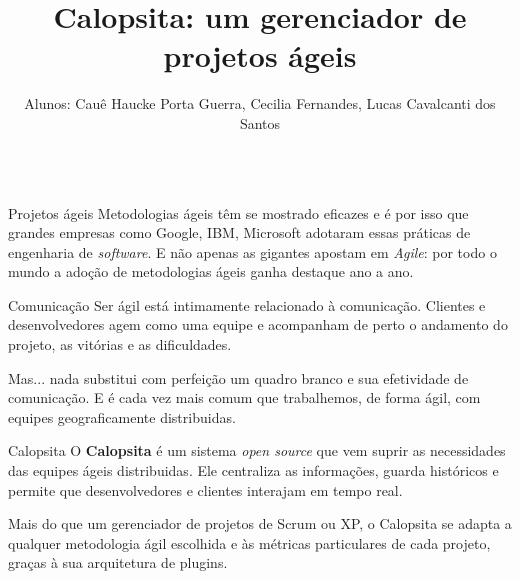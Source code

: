\documentclass[serif,mathserif,final]{beamer}
\title{Calopsita: um gerenciador de projetos ágeis}
\author{Alunos: Cauê Haucke Porta Guerra, Cecilia Fernandes, Lucas Cavalcanti dos Santos}
\begin{document}
\begin{frame}{}
  \begin{columns}[t]

    \begin{column}{0.29\linewidth}

      \begin{block}{Projetos ágeis}
		Metodologias ágeis têm se mostrado eficazes e é por isso que grandes 
		empresas como Google, IBM, Microsoft adotaram essas práticas de 
		engenharia de \textit{software}. E não apenas as gigantes apostam em 
		\textit{Agile}: por todo o mundo a adoção de metodologias ágeis ganha 
		destaque ano a ano. 
      \end{block}

	  \vspace{1cm}
      
      \begin{block}{Comunicação}
        Ser ágil está intimamente relacionado à comunicação. Clientes e 
		desenvolvedores agem como uma equipe e acompanham de perto o andamento 
		do projeto, as vitórias e as dificuldades.
	
		\vspace{1cm}

		Mas... nada substitui com perfeição um quadro branco e sua efetividade 
		de comunicação. E é cada vez mais comum que trabalhemos, de forma ágil,
		com equipes geograficamente distribuidas. 
      \end{block}

	  \vspace{1cm}
      
	  \begin{block}{Calopsita}
		O \textbf{Calopsita} é um sistema \textit{open source} que vem suprir as 
		necessidades das equipes ágeis distribuidas. Ele centraliza as informações, 
		guarda históricos e permite que desenvolvedores e clientes interajam em 
		tempo real.

		\vspace{1pt}

		Mais do que um gerenciador de projetos de Scrum ou XP, o Calopsita se 
		adapta a qualquer metodologia ágil escolhida e às métricas particulares
		de cada projeto, graças à sua arquitetura de plugins.

		\vspace{2cm}
      

\end{block}
\end{column}
\end{columns}
\end{frame}
\end{document}
